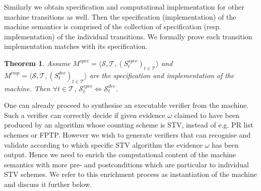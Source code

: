 \documentclass[10pt,conference]{IEEEtran}
\newtheorem{theorem}{Theorem}
\begin{document}
Similarly  
we obtain specification and computational implementation for other machine transitions as well. Then the specification (implementation) of the machine semantics is comprised of the collection of specification (resp. implementation) of the individual transitions. We formally prove 
each transition implementation  matches with its specification.
\begin{theorem}
Assume $M^{spec} = \langle \mathcal{S}, \mathcal{T}, (S_{t}^{spec})_{t \in \mathcal{T}} \rangle$ and $M^{imp} = \langle \mathcal{S}, \mathcal{T}, (S_{t}^{dec})_{t \in \mathcal{T}} \rangle$ are the specification and  implementation of the machine. Then  $\forall t\in\mathcal{T}$,  $\mathcal{S}_{t}^{spec}\Leftrightarrow\mathcal{S}_{t}^{dec}$.      
\end{theorem}

One can already proceed to synthesise an executable verifier from the machine. Such a verifier can correctly decide if given evidence $\omega$ claimed to have been produced by an algorithm whose counting scheme is STV, instead of e.g. PR list schemes or FPTP.  
However we wish to generate verifiers that can recognise and validate according to which specific STV algorithm the evidence $\omega$ has been output. Hence we need to enrich the computational content of the machine semantics with more  pre- and postconditions which are particular to individual STV schemes. We refer to this enrichment process as instantiation of the machine and discuss it further below.
\end{document}
